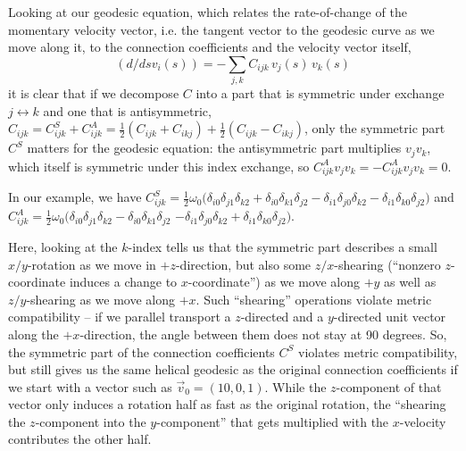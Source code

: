 \documentclass[twocolumn]{article}
\begin{document}
Looking at our geodesic equation, which relates the rate-of-change of
the momentary velocity vector, i.e. the tangent vector to the geodesic
curve as we move along it, to the connection coefficients and the
velocity vector itself,
\begin{equation}
  (d/ds v_i(s)) = -\sum_{j,k}C_{ijk}\,v_j(s)\,v_k(s)
\end{equation}
it is clear that if we decompose $C$ into a part that is symmetric
under exchange $j\leftrightarrow k$ and one that is antisymmetric,
$C_{ijk}=C^S_{ijk}+C^A_{ijk}=\frac{1}{2}\left(C_{ijk}+C_{ikj}\right)+\frac{1}{2}\left(C_{ijk}-C_{ikj}\right)$,
only the symmetric part $C^S$ matters for the geodesic equation: the
antisymmetric part multiplies $v_jv_k$, which itself is symmetric under
this index exchange, so $C^A_{ijk}v_jv_k=-C^A_{ijk}v_jv_k=0$.

In our example, we have
$C^S_{ijk}=\frac{1}{2}\omega_0\bigl(
  \delta_{i0}\delta_{j1}\delta_{k2}+\delta_{i0}\delta_{k1}\delta_{j2}
  -\delta_{i1}\delta_{j0}\delta_{k2}-\delta_{i1}\delta_{k0}\delta_{j2}
\bigr)$
and
$C^A_{ijk}=\frac{1}{2}\omega_0\bigl(\delta_{i0}\delta_{j1}\delta_{k2}-\delta_{i0}\delta_{k1}\delta_{j2}
$
%
$-\delta_{i1}\delta_{j0}\delta_{k2}+\delta_{i1}\delta_{k0}\delta_{j2}\bigr)$.

Here, looking at the $k$-index tells us that the symmetric part
describes a small $x/y$-rotation as we move in $+z$-direction, but
also some $z/x$-shearing (``nonzero $z$-coordinate induces a change to
$x$-coordinate'') as we move along $+y$ as well as $z/y$-shearing as
we move along $+x$. Such ``shearing'' operations violate metric
compatibility -- if we parallel transport a $z$-directed and a
$y$-directed unit vector along the $+x$-direction, the angle between
them does not stay at 90 degrees. So, the symmetric part of the
connection coefficients $C^S$ violates metric compatibility,
but still gives us the same helical geodesic as the original
connection coefficients if we start with a vector such as
$\vec v_0=(10, 0, 1)$. While the $z$-component of that vector
only induces a rotation half as fast as the original rotation,
the ``shearing the $z$-component into the $y$-component'' that
gets multiplied with the $x$-velocity contributes the other half.
\end{document}
